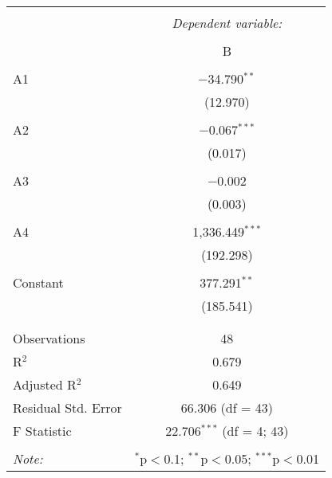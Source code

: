 \documentclass[a4paper,10pt]{article}
\begin{document}
\begin{table}[!htbp] \centering 
	\caption{} 
	\label{} 
	\begin{tabular}{@{\extracolsep{5pt}}lc} 
		\\[-1.8ex]\hline 
		\hline \\[-1.8ex] 
		& \multicolumn{1}{c}{\textit{Dependent variable:}} \\ 
		\cline{2-2} 
		\\[-1.8ex] & B \\ 
		\hline \\[-1.8ex] 
		A1 & $-$34.790$^{**}$ \\ 
		& (12.970) \\ 
		& \\ 
		A2 & $-$0.067$^{***}$ \\ 
		& (0.017) \\ 
		& \\ 
		A3 & $-$0.002 \\ 
		& (0.003) \\ 
		& \\ 
		A4 & 1,336.449$^{***}$ \\ 
		& (192.298) \\ 
		& \\ 
		Constant & 377.291$^{**}$ \\ 
		& (185.541) \\ 
		& \\ 
		\hline \\[-1.8ex] 
		Observations & 48 \\ 
		R$^{2}$ & 0.679 \\ 
		Adjusted R$^{2}$ & 0.649 \\ 
		Residual Std. Error & 66.306 (df = 43) \\ 
		F Statistic & 22.706$^{***}$ (df = 4; 43) \\ 
		\hline 
		\hline \\[-1.8ex] 
		\textit{Note:}  & \multicolumn{1}{r}{$^{*}$p$<$0.1; $^{**}$p$<$0.05; $^{***}$p$<$0.01} \\ 
	\end{tabular} 
\end{table} 
\end{document}
